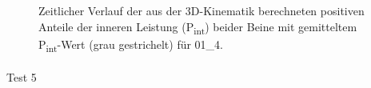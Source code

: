 \documentclass[
  letterpaper,
  DIV=11]{scrartcl}
\makeatletter
\let\oldparagraph\paragraph
\renewcommand{\paragraph}{
    \@ifstar
      \xxxParagraphStar
      \xxxParagraphNoStar
  }
\newcommand{\xxxParagraphStar}[1]{\oldparagraph*{#1}\mbox{}}
\newcommand{\xxxParagraphNoStar}[1]{\oldparagraph{#1}\mbox{}}
\makeatother
\begin{document}
\begin{figure}


\caption{\label{fig-PInt_Kinematik_01_4}Zeitlicher Verlauf der aus der
3D-Kinematik berechneten positiven Anteile der inneren Leistung
(P\textsubscript{int}) beider Beine mit gemitteltem
P\textsubscript{int}-Wert (grau gestrichelt) für 01\_4.}

\end{figure}%

\paragraph{Test 5}
\end{document}
